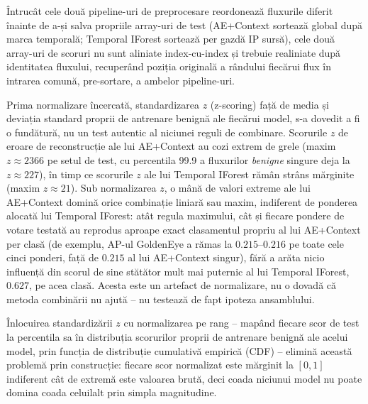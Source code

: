Întrucât cele două pipeline-uri de preprocesare reordonează fluxurile diferit înainte de a-și salva propriile array-uri de test (AE+Context sortează global după marca temporală; Temporal IForest sortează per gazdă IP sursă), cele două array-uri de scoruri nu sunt aliniate index-cu-index și trebuie realiniate după identitatea fluxului, recuperând poziția originală a rândului fiecărui flux în intrarea comună, pre-sortare, a ambelor pipeline-uri.


Prima normalizare încercată, standardizarea $z$ (z-scoring) față de media și deviația standard proprii de antrenare benignă ale fiecărui model, s-a dovedit a fi o fundătură, nu un test autentic al niciunei reguli de combinare. Scorurile $z$ de eroare de reconstrucție ale lui AE+Context au cozi extrem de grele (maxim $z \approx 2366$ pe setul de test, cu percentila 99.9 a fluxurilor \emph{benigne} singure deja la $z \approx 227$), în timp ce scorurile $z$ ale lui Temporal IForest rămân strâns mărginite (maxim $z \approx 21$). Sub normalizarea $z$, o mână de valori extreme ale lui AE+Context domină orice combinație liniară sau maxim, indiferent de ponderea alocată lui Temporal IForest: atât regula maximului, cât și fiecare pondere de votare testată au reprodus aproape exact clasamentul propriu al lui AE+Context per clasă (de exemplu, AP-ul GoldenEye a rămas la $0.215$--$0.216$ pe toate cele cinci ponderi, față de $0.215$ al lui AE+Context singur), fără a arăta nicio influență din scorul de sine stătător mult mai puternic al lui Temporal IForest, $0.627$, pe acea clasă. Acesta este un artefact de normalizare, nu o dovadă că metoda combinării nu ajută -- nu testează de fapt ipoteza ansamblului.

Înlocuirea standardizării $z$ cu normalizarea pe rang -- mapând fiecare scor de test la percentila sa în distribuția scorurilor proprii de antrenare benignă ale acelui model, prin funcția de distribuție cumulativă empirică (CDF) -- elimină această problemă prin construcție: fiecare scor normalizat este mărginit la $[0,1]$ indiferent cât de extremă este valoarea brută, deci coada niciunui model nu poate domina coada celuilalt prin simpla magnitudine.